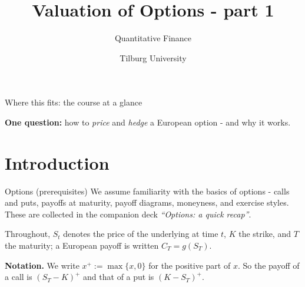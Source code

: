 \documentclass[pdf, handout]{beamer}
\title{Valuation of Options - part 1}
\subtitle{Quantitative Finance}
\author{Tilburg University}
\institute{Ramon van den Akker}
\date{}
\begin{document}
\begin{frame}
\titlepage
\end{frame}

\begin{frame}{Where this fits: the course at a glance}
\begin{center}
\end{center}
\textbf{One question:} how to \emph{price} and \emph{hedge} a European option - and why it works.
\end{frame}

\section{Introduction}

\begin{frame}{Options (prerequisites)}
We assume familiarity with the basics of options - calls and puts, payoffs at maturity, payoff diagrams, moneyness, and exercise styles. These are collected in the companion deck \emph{``Options: a quick recap''}.
\medskip

Throughout, $S_t$ denotes the price of the underlying at time $t$, $K$ the strike, and $T$ the maturity; a European payoff is written $C_T=g(S_T)$.
\medskip

\textbf{Notation.} We write $x^+:=\max\{x,0\}$ for the positive part of $x$. So the payoff of a call is $(S_T-K)^+$ and that of a put is $(K-S_T)^+$.
\end{frame}
\end{document}
